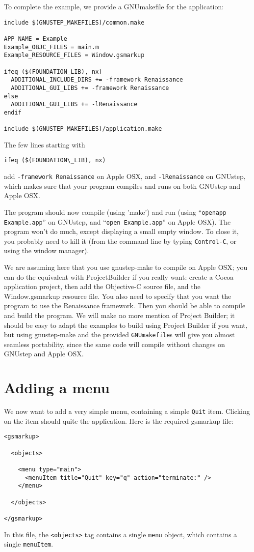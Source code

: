\documentclass[a4paper]{article}
\begin{document}
To complete the example, we provide a GNUmakefile for the application:
\begin{verbatim}
include $(GNUSTEP_MAKEFILES)/common.make

APP_NAME = Example
Example_OBJC_FILES = main.m
Example_RESOURCE_FILES = Window.gsmarkup

ifeq ($(FOUNDATION_LIB), nx)
  ADDITIONAL_INCLUDE_DIRS += -framework Renaissance
  ADDITIONAL_GUI_LIBS += -framework Renaissance
else
  ADDITIONAL_GUI_LIBS += -lRenaissance
endif

include $(GNUSTEP_MAKEFILES)/application.make
\end{verbatim}
The few lines starting with 
\begin{verbatim}
ifeq ($(FOUNDATION\_LIB), nx)
\end{verbatim}
add \texttt{-framework Renaissance} on Apple OSX, and
\texttt{-lRenaissance} on GNUstep, which makes sure that your program
compiles and runs on both GNUstep and Apple OSX.

The program should now compile (using 'make') and run (using
``\texttt{openapp Example.app}'' on GNUstep, and ``\texttt{open
Example.app}'' on Apple OSX).  The program won't do much, except
displaying a small empty window.  To close it, you probably need to
kill it (from the command line by typing \texttt{Control-C}, or using
the window manager).

We are assuming here that you use gnustep-make to compile on Apple
OSX; you can do the equivalent with ProjectBuilder if you really want:
create a Cocoa application project, then add the Objective-C source
file, and the Window.gsmarkup resource file.  You also need to specify
that you want the program to use the Renaissance framework.  Then you
should be able to compile and build the program.  We will make no more
mention of Project Builder; it should be easy to adapt the examples to
build using Project Builder if you want, but using gnustep-make and
the provided \texttt{GNUmakefile}s will give you almost seamless
portability, since the same code will compile without changes on
GNUstep and Apple OSX.

\section{Adding a menu}
We now want to add a very simple menu, containing a simple
\texttt{Quit} item.  Clicking on the item should quite the application.
Here is the required gsmarkup file:
\begin{verbatim}
<gsmarkup>

  <objects>

    <menu type="main">
      <menuItem title="Quit" key="q" action="terminate:" />
    </menu>
 
  </objects>

</gsmarkup>
\end{verbatim}
In this file, the \texttt{<objects>} tag contains a single
\texttt{menu} object, which contains a single \texttt{menuItem}.
\end{document}
